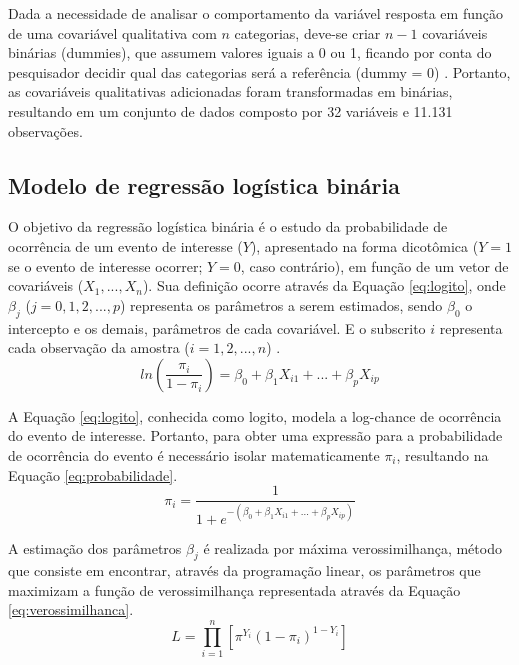 \documentclass[twocolumn]{rbef}
\newcommand{\1}{\mathbbm{1}}
\begin{document}
Dada a necessidade de analisar o comportamento da variável resposta em função de uma covariável qualitativa com \(n\) categorias, deve-se criar \(n-1\) covariáveis binárias (dummies), que assumem valores iguais a 0 ou 1, ficando por conta do pesquisador decidir qual das categorias será a referência (dummy = 0) \cite{Favero2017}. Portanto, as covariáveis qualitativas adicionadas foram transformadas em binárias, resultando em um conjunto de dados composto por 32 variáveis e 11.131 observações.

\hypertarget{modelo-de-regressuxe3o-loguxedstica-binuxe1ria}{%
\subsection{Modelo de regressão logística binária}\label{modelo-de-regressuxe3o-loguxedstica-binuxe1ria}}

O objetivo da regressão logística binária é o estudo da probabilidade de ocorrência de um evento de interesse (\(Y\)), apresentado na forma dicotômica (\(Y=1\) se o evento de interesse ocorrer; \(Y=0\), caso contrário), em função de um vetor de covariáveis (\(X_1, ..., X_n\)). Sua definição ocorre através da Equação \eqref{eq:logito}, onde \(\beta_j\) (\(j = 0,1,2,...,p\)) representa os parâmetros a serem estimados, sendo \(\beta_0\) o intercepto e os demais, parâmetros de cada covariável. E o subscrito \(i\) representa cada observação da amostra (\(i = 1, 2,...,n\)) \cite{Favero2017}.
\begin{equation}
ln \left ( \dfrac{\pi_i}{1-\pi_i} \right ) = \beta_0 + \beta_1 X_{i1} + ... +  \beta_p X_{ip}\label{eq:logito}
\end{equation}

A Equação \eqref{eq:logito}, conhecida como logito, modela a log-chance de ocorrência do evento de interesse. Portanto, para obter uma expressão para a probabilidade de ocorrência do evento é necessário isolar matematicamente \(\pi_i\), resultando na Equação \eqref{eq:probabilidade}.
\begin{equation}
\pi_i = \dfrac{1}{1 + e^{-(\beta_0 + \beta_1 X_{i1} + ... +  \beta_p X_{ip})}}\label{eq:probabilidade}
\end{equation}

A estimação dos parâmetros \(\beta_j\) é realizada por máxima verossimilhança, método que consiste em encontrar, através da programação linear, os parâmetros que maximizam a função de verossimilhança representada através da Equação \eqref{eq:verossimilhanca}.
\begin{equation}
L =  \prod_{i=1}^{n} \left[ \pi^{Y_i} (1-\pi_i)^{1-Y_i} \right]\label{eq:verossimilhanca}
\end{equation}
\end{document}
